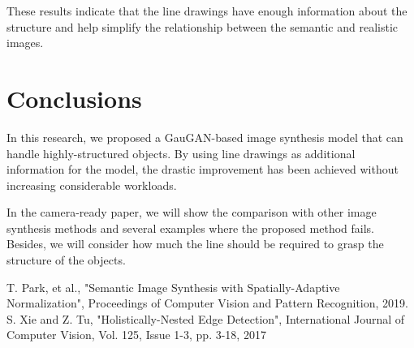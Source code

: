 \documentclass[a4paper]{article}
\newcommand{\aftersection}{\vspace{-5pt}}
\newcommand{\beforesection}{\vspace{-10pt}}
\begin{document}
\begin{multicols}{2}
These results indicate that the line drawings have enough information about the structure and help simplify the relationship between the semantic and realistic images.

\beforesection
\section*{Conclusions}
\aftersection

In this research, we proposed a GauGAN-based image synthesis model that can handle highly-structured objects.
By using line drawings as additional information for the model, the drastic improvement has been achieved without increasing considerable workloads. 

In the camera-ready paper, we will show the comparison with other image synthesis methods and several examples where the proposed method fails. Besides, we will consider how much the line should be required to grasp the structure of the objects.

\vspace{-20pt}
\begin{thebibliography}{9}
T. Park, et al., "Semantic Image Synthesis with Spatially-Adaptive Normalization", Proceedings of Computer Vision and Pattern Recognition, 2019. 
S. Xie and Z. Tu, "Holistically-Nested Edge Detection", International Journal of Computer Vision, 
Vol. 125, Issue 1-3, pp. 3-18, 2017
\end{thebibliography}

\end{multicols}
\end{document}
